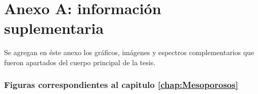 \cleardoublepage{}
{}
\FormatoAnexoA

\AddLabelsAxUno

\let\originalstyle=\thispagestyle            %
\def\thispagestyle#1{\fancyfoot[C]{}}       %
\def\thispagestyle#1{\originalstyle{empty}} %
\def\thispagestyle#1{}                       %

\renewcommand\thefigure{A.\arabic{figure}} 

\chapter*{Anexo A: información suplementaria}
    
    Se agregan en éste anexo los gráficos, imágenes y espectros complementarios que fueron apartados del cuerpo principal de la tesis. 

    \subsection*{Figuras correspondientes al capitulo \ref{chap:Mesoporosos}}


